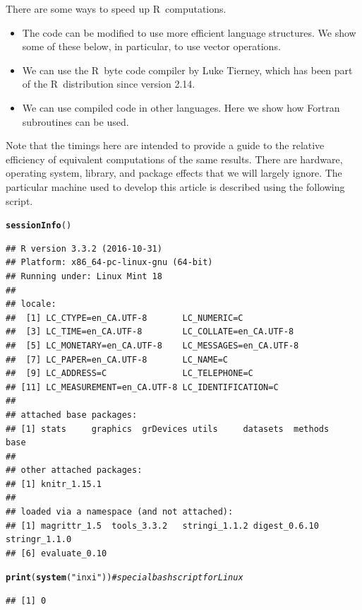 \documentclass[10pt]{article}\usepackage[]{graphicx}\usepackage[]{color}
\makeatletter
\newcommand{\hlstr}[1]{\textcolor[rgb]{0.192,0.494,0.8}{#1}}%
\newcommand{\hlcom}[1]{\textcolor[rgb]{0.678,0.584,0.686}{\textit{#1}}}%
\newcommand{\hlstd}[1]{\textcolor[rgb]{0.345,0.345,0.345}{#1}}%
\newcommand{\hlkwd}[1]{\textcolor[rgb]{0.737,0.353,0.396}{\textbf{#1}}}%
\newenvironment{kframe}{%
 \def\at@end@of@kframe{}%
 \ifinner\ifhmode%
  \def\at@end@of@kframe{\end{minipage}}%
  \begin{minipage}{\columnwidth}%
 \fi\fi%
 \def\FrameCommand##1{\hskip\@totalleftmargin \hskip-\fboxsep
 \colorbox{shadecolor}{##1}\hskip-\fboxsep
     \hskip-\linewidth \hskip-\@totalleftmargin \hskip\columnwidth}%
 \MakeFramed {\advance\hsize-\width
   \@totalleftmargin\z@ \linewidth\hsize
   \@setminipage}}%
 {\par\unskip\endMakeFramed%
 \at@end@of@kframe}
\newenvironment{knitrout}{}{} %
\newcommand{\R}{{\sf R\ }}
\makeatother
\begin{document}
There are some ways to speed up \R computations. 

\begin{itemize}
\item{The code can be modified to use more efficient language structures. We
show some of these below, in particular, to use vector operations.}
\item{We can use the \R byte code compiler by Luke Tierney, which has been 
part of the \R distribution since version 2.14.}
\item{We can use compiled code in other languages. Here we show how Fortran
subroutines can be used.}
\end{itemize}

Note that the timings here are intended to provide a guide to the relative 
efficiency of equivalent computations of the same results. There are hardware,
operating system, library, and package effects that we will largely ignore.
The particular machine used to develop this article is described using 
the following script.

\begin{knitrout}\scriptsize
{}\color{fgcolor}\begin{kframe}
\begin{alltt}
\hlkwd{sessionInfo}\hlstd{()}
\end{alltt}
\begin{verbatim}
## R version 3.3.2 (2016-10-31)
## Platform: x86_64-pc-linux-gnu (64-bit)
## Running under: Linux Mint 18
## 
## locale:
##  [1] LC_CTYPE=en_CA.UTF-8       LC_NUMERIC=C              
##  [3] LC_TIME=en_CA.UTF-8        LC_COLLATE=en_CA.UTF-8    
##  [5] LC_MONETARY=en_CA.UTF-8    LC_MESSAGES=en_CA.UTF-8   
##  [7] LC_PAPER=en_CA.UTF-8       LC_NAME=C                 
##  [9] LC_ADDRESS=C               LC_TELEPHONE=C            
## [11] LC_MEASUREMENT=en_CA.UTF-8 LC_IDENTIFICATION=C       
## 
## attached base packages:
## [1] stats     graphics  grDevices utils     datasets  methods   base     
## 
## other attached packages:
## [1] knitr_1.15.1
## 
## loaded via a namespace (and not attached):
## [1] magrittr_1.5  tools_3.3.2   stringi_1.1.2 digest_0.6.10 stringr_1.1.0
## [6] evaluate_0.10
\end{verbatim}
\begin{alltt}
\hlkwd{print}\hlstd{(}\hlkwd{system}\hlstd{(}\hlstr{"inxi"}\hlstd{))} \hlcom{# special bash script for Linux}
\end{alltt}
\begin{verbatim}
## [1] 0
\end{verbatim}
\end{kframe}
\end{knitrout}
\end{document}
